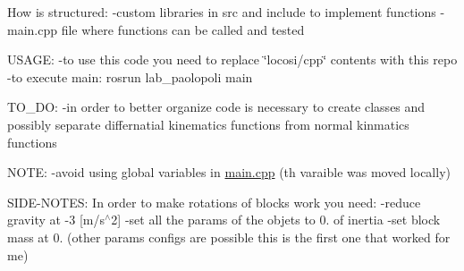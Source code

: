 How is structured\+: -\/custom libraries in src and include to implement functions -\/main.\+cpp file where functions can be called and tested

U\+S\+A\+GE\+: -\/to use this code you need to replace \char`\"{}locosi/cpp\char`\"{} contents with this repo -\/to execute main\+: rosrun lab\+\_\+paolopoli main

T\+O\+\_\+\+DO\+: -\/in order to better organize code is necessary to create classes and possibly separate differnatial kinematics functions from normal kinmatics functions

N\+O\+TE\+: -\/avoid using global variables in \mbox{\hyperlink{main_8cpp}{main.\+cpp}} (th varaible was moved locally)

S\+I\+D\+E-\/\+N\+O\+T\+ES\+: In order to make rotations of blocks work you need\+: -\/reduce gravity at -\/3 \mbox{[}m/s$^\wedge$2\mbox{]} -\/set all the params of the objets to 0. of inertia -\/set block mass at 0. (other params configs are possible this is the first one that worked for me) 